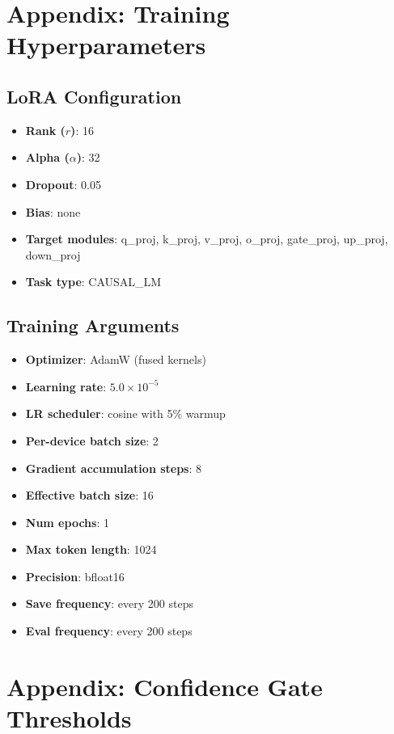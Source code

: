 \documentclass{article}
\begin{document}
\section{Appendix: Training Hyperparameters}
\label{app:hyperparams}

\subsection{LoRA Configuration}
\begin{itemize}[leftmargin=*,itemsep=0.5ex]
  \item \textbf{Rank ($r$)}: 16
  \item \textbf{Alpha ($\alpha$)}: 32
  \item \textbf{Dropout}: 0.05
  \item \textbf{Bias}: none
  \item \textbf{Target modules}: q\_proj, k\_proj, v\_proj, o\_proj, gate\_proj, up\_proj, down\_proj
  \item \textbf{Task type}: CAUSAL\_LM
\end{itemize}

\subsection{Training Arguments}
\begin{itemize}[leftmargin=*,itemsep=0.5ex]
  \item \textbf{Optimizer}: AdamW (fused kernels)
  \item \textbf{Learning rate}: $5.0 \times 10^{-5}$
  \item \textbf{LR scheduler}: cosine with 5\% warmup
  \item \textbf{Per-device batch size}: 2
  \item \textbf{Gradient accumulation steps}: 8
  \item \textbf{Effective batch size}: 16
  \item \textbf{Num epochs}: 1
  \item \textbf{Max token length}: 1024
  \item \textbf{Precision}: bfloat16
  \item \textbf{Save frequency}: every 200 steps
  \item \textbf{Eval frequency}: every 200 steps
\end{itemize}

\section{Appendix: Confidence Gate Thresholds}
\label{app:thresholds}
\end{document}
